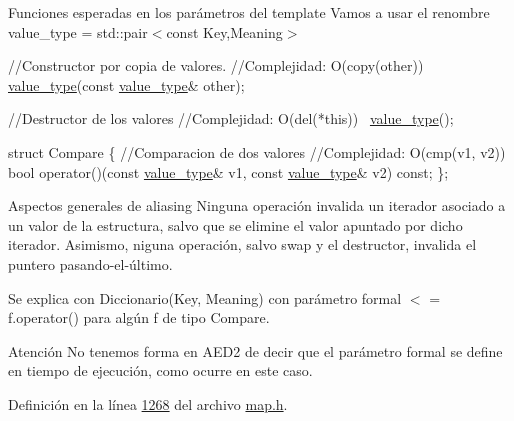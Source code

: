 \begin{DoxyParagraph}{Funciones esperadas en los parámetros del template}
Vamos a usar el renombre value\-\_\-type = std\-::pair$<$const Key,\-Meaning$>$


\begin{DoxyCode}
\textcolor{comment}{//Constructor por copia de valores.}
\textcolor{comment}{//Complejidad: O(copy(other))}
\hyperlink{classaed2_1_1map_a719db98e0ff9a837610f76be33264680_a719db98e0ff9a837610f76be33264680}{value\_type}(\textcolor{keyword}{const} \hyperlink{classaed2_1_1map_a719db98e0ff9a837610f76be33264680_a719db98e0ff9a837610f76be33264680}{value\_type}& other);

\textcolor{comment}{//Destructor de los valores}
\textcolor{comment}{//Complejidad: O(del(*this))}
~\hyperlink{classaed2_1_1map_a719db98e0ff9a837610f76be33264680_a719db98e0ff9a837610f76be33264680}{value\_type}();

\textcolor{keyword}{struct }Compare \{
  \textcolor{comment}{//Comparacion de dos valores}
  \textcolor{comment}{//Complejidad: O(cmp(v1, v2))}
  \textcolor{keywordtype}{bool} operator()(\textcolor{keyword}{const} \hyperlink{classaed2_1_1map_a719db98e0ff9a837610f76be33264680_a719db98e0ff9a837610f76be33264680}{value\_type}& v1, \textcolor{keyword}{const} \hyperlink{classaed2_1_1map_a719db98e0ff9a837610f76be33264680_a719db98e0ff9a837610f76be33264680}{value\_type}& v2) \textcolor{keyword}{const};
\};
\end{DoxyCode}
 
\end{DoxyParagraph}


\begin{DoxyParagraph}{Aspectos generales de aliasing}
Ninguna operación invalida un iterador asociado a un valor de la estructura, salvo que se elimine el valor apuntado por dicho iterador. Asimismo, niguna operación, salvo swap y el destructor, invalida el puntero pasando-\/el-\/último.
\end{DoxyParagraph}
\begin{DoxyParagraph}{Se explica con}
Diccionario(Key, Meaning) con parámetro formal $<$ = f.\-operator() para algún f de tipo Compare.
\end{DoxyParagraph}
\begin{DoxyAttention}{Atención}
No tenemos forma en A\-E\-D2 de decir que el parámetro formal se define en tiempo de ejecución, como ocurre en este caso. 
\end{DoxyAttention}


Definición en la línea \hyperlink{map_8h_source_l01268}{1268} del archivo \hyperlink{map_8h_source}{map.\-h}.



